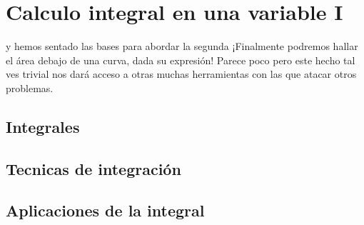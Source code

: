 \chapter{Calculo integral en una variable I} %
\label{cha:calculo_integral_en_una_variable_i}

\noindent {} y hemos
sentado las bases para abordar la segunda ¡Finalmente podremos hallar el área
debajo de una curva, dada su expresión! Parece poco pero este hecho tal ves
trivial nos dará acceso a otras muchas herramientas con las que atacar otros
problemas. 

\section{Integrales} %
\label{sec:integrales}

\section{Tecnicas de integración} %
\label{sec:tecnicas_de_integracion}

\section{Aplicaciones de la integral} %
\label{sec:aplicaciones_de_la_integral}